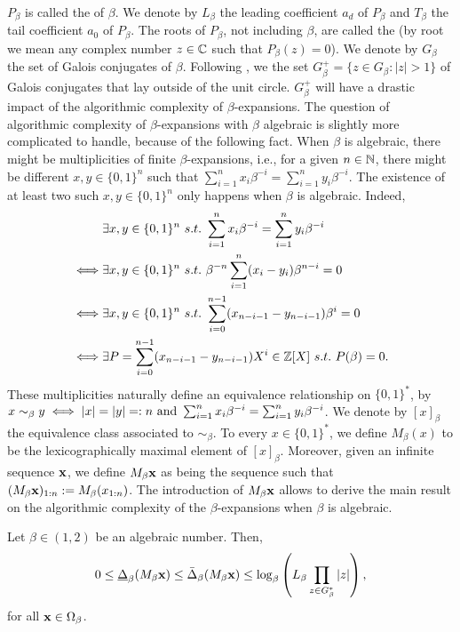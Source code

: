 	$P_\beta$ is called the  of $\beta$. We denote by $L_\beta$ the leading coefficient $a_d$ of $P_\beta$ and $T_\beta$ the tail coefficient $a_0$ of $P_\beta$. The roots of $P_\beta$, not including $\beta$, are called the  (by root we mean any complex number $z \in \mathbb{C}$ such that $P_\beta(z) = 0$). We denote by $G_\beta$ the set of Galois conjugates of $\beta$. Following \cite[Lemma 1.51]{garsia1962ArithmeticPropertiesBernoulli}, we the set $G^+_\beta = \{z \in G_\beta : |z| > 1 \}$ of Galois conjugates that lay outside of the unit circle. $G^+_\beta$ will have a drastic impact of the algorithmic complexity of $\beta$-expansions.
	The question of algorithmic complexity of $\beta$-expansions with $\beta$ algebraic is slightly more complicated to handle, because of the following fact. When $\beta$ is algebraic, there might be multiplicities of finite $\beta$-expansions, i.e., for a given $n \in \mathbb{N}$, there might be different $x,y \in \{0,1\}^n$ such that $\sum_{i=1}^n x_i \beta^{-i} = \sum_{i=1}^n y_i \beta^{-i}$. The existence of at least two such $x,y \in \{0,1\}^n$ only happens when $\beta$ is algebraic. Indeed,
	\begin{align}
		&\exists x,y \in \{0,1\}^n \ s.t. \ \sum_{i=1}^n x_i \beta^{-i} = \sum_{i=1}^n y_i \beta^{-i}\\
		\iff & \exists x,y \in \{0,1\}^n \ s.t. \ \beta^{-n}\sum_{i=1}^n (x_i - y_i) \beta^{n-i} = 0\\
		\iff & \exists x,y \in \{0,1\}^n \ s.t. \ \sum_{i=0}^{n-1} (x_{n-i-1} - y_{n-i-1}) \beta^{i} = 0\\
		\iff & \exists P = \sum_{i=0}^{n-1} (x_{n-i-1} - y_{n-i-1}) X^{i} \in \Z[X] \ s.t. \ P(\beta) = 0.
	\end{align}
	These multiplicities naturally define an equivalence relationship on $\{0,1\}^\ast$, by $x \sim_\beta y \iff \len x = \len y =: n \ \text{and} \ \sum_{i=1}^n x_i \beta^{-i} = \sum_{i=1}^n y_i \beta^{-i}$. We denote by $[x]_\beta$ the equivalence class associated to $\sim_\beta$. To every $x \in \{0,1\}^\ast$, we define $M_\beta(x)$ to be the lexicographically maximal element of $[x]_\beta$. Moreover, given an infinite sequence ${\bf x}$, we define $M_\beta {\bf x}$ as being the sequence such that $(M_\beta {\bf x})_{1:n} := M_\beta(x_{1:n})$. The introduction of $M_\beta{\bf x}$ allows to derive the main result on the algorithmic complexity of the $\beta$-expansions when $\beta$ is algebraic.
	\begin{theorem}\label{thm:upper bound on the relative compressibility of beta expansions for algebraic beta}
		Let $\beta \in (1,2)$ be an algebraic number. Then,
		\begin{equation}
			0 \leq \underline\Delta_\beta(M_\beta{\bf x}) \leq \bar\Delta_\beta(M_\beta{\bf x}) \leq \log_\beta\left(L_\beta \prod_{z \in G^\ast_\beta} \left|z \right|\right),
		\end{equation}
		for all ${\bf x} \in \Omega_\beta$.
	\end{theorem}
